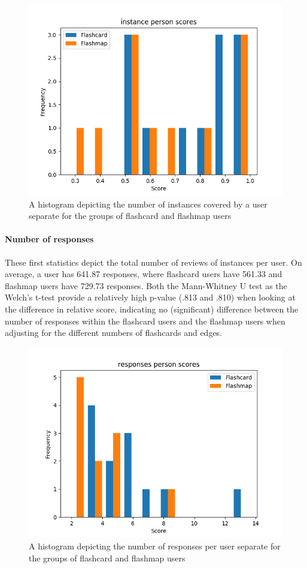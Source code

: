 \begin{figure}
    \centering
    \includegraphics[width=.7\textwidth]{img/instance_abil.png}
    \caption{A histogram depicting the number of instances covered by a user separate for the groups of flashcard and flashmap users}
    \label{fig:instance_abil}
\end{figure}

\paragraph{Number of responses} These first statistics depict the total number of reviews of instances per user. On average, a user has 641.87 responses, where flashcard users have 561.33 and flashmap users have 729.73 responses. Both the Mann-Whitney U test as the Welch's t-test provide a relatively high p-value (.813 and .810) when looking at the difference in relative score, indicating no (significant) difference between the number of responses within the flashcard users and the flashmap users when adjusting for the different numbers of flashcards and edges.

\begin{figure}
    \centering
    \includegraphics[width=.7\textwidth]{img/responses_abil.png}
    \caption{A histogram depicting the number of responses per user separate for the groups of flashcard and flashmap users}
    \label{fig:responses_abil}
\end{figure}

